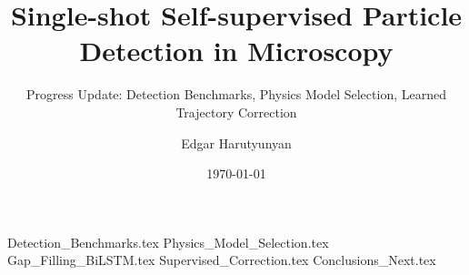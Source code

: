\documentclass[aspectratio=\BeamerAspectRatio]{beamer}
\title[LodeSTAR Project]{Single-shot Self-supervised Particle Detection in Microscopy}
\subtitle[]{Progress Update: Detection Benchmarks, Physics Model Selection, Learned Trajectory Correction}
\author{Edgar Harutyunyan}
\institute
{Molecular Nanophotonics Group\\
Peter Debye Institute for Soft Matter Physics\\
Universit\"at Leipzig}
\date{\today}
\begin{document}
\maketitlepage
\maketableofcontents
\makesectionpopup

{Detection_Benchmarks.tex}
{Physics_Model_Selection.tex}
{Gap_Filling_BiLSTM.tex}
{Supervised_Correction.tex}
{Conclusions_Next.tex}
\end{document}
